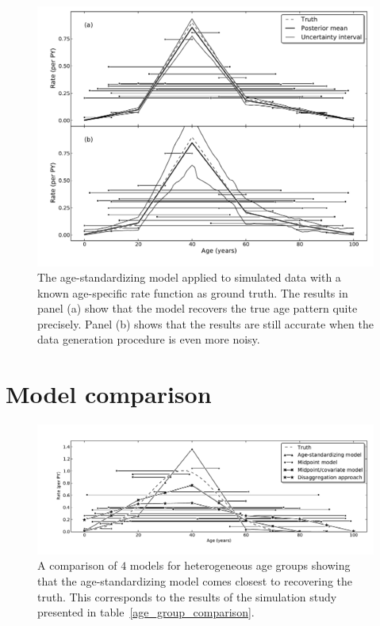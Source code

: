 \begin{figure}[h]
\begin{center}
\includegraphics[width=\textwidth]{age_group_standardize.pdf}
\caption{The age-standardizing model applied to simulated data with a
  known age-specific rate function as ground truth.  The results in
  panel (a) show that the model
  recovers the true age pattern quite precisely. Panel (b) shows that the
  results are still accurate when the data generation procedure is
  even more noisy.}
\label{age-group-standardize}
\end{center}
\end{figure}


\section{Model comparison}
\label{agm-compare}

\begin{figure}[h]
\begin{center}
\includegraphics[width=\textwidth]{age_group_models.pdf}
\caption{A comparison of $4$ models for heterogeneous age groups showing that the age-standardizing model comes closest to recovering the truth.  This corresponds to the results of the simulation study presented in table~\ref{age_group_comparison}.}
\label{age-group-model-comparison}
\end{center}
\end{figure}



